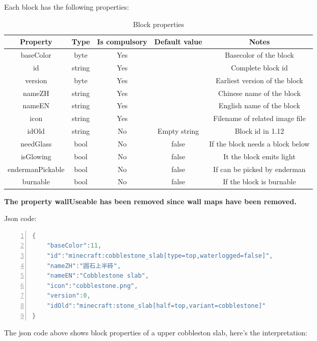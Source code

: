 \documentclass{article}
\begin{document}
Each block has the following properties:
\begin{table}[h]
    \centering
    \caption{Block properties}
    \begin{tabular}{ccccc}
        \hline
        Property         & Type   & Is compulsory & Default value & Notes                            \\ \hline
        baseColor        & byte   & Yes           &               & Basecolor of the block           \\
        id               & string & Yes           &               & Complete block id                \\
        version          & byte   & Yes           &               & Earliest version of the block    \\
        nameZH           & string & Yes           &               & Chinese name of the block        \\
        nameEN           & string & Yes           &               & English name of the block        \\
        icon             & string & Yes           &               & Filename of related image file   \\
        idOld            & string & No            & Empty string  & Block id in 1.12                 \\
        needGlass        & bool   & No            & false         & If the block needs a block below \\
        isGlowing        & bool   & No            & false         & It the block emits light         \\
        endermanPickable & bool   & No            & false         & If can be picked by enderman     \\
        burnable         & bool   & No            & false         & If the block is burnable         \\
        \hline
    \end{tabular}
\end{table}

\textbf{The property wallUseable has been removed since wall maps have been removed.}

\clearpage
Json code:
\begin{lstlisting}[language = C++, numbers=left, 
    numberstyle=\tiny,keywordstyle=\color{blue!70},
    commentstyle=\color{red!50!green!50!blue!50},frame=shadowbox,
    rulesepcolor=\color{red!20!green!20!blue!20},basicstyle=\ttfamily]
{
    "baseColor":11,
    "id":"minecraft:cobblestone_slab[type=top,waterlogged=false]",
    "nameZH":"圆石上半砖",
    "nameEN":"Cobblestone slab",
    "icon":"cobblestone.png",
    "version":0,
    "idOld":"minecraft:stone_slab[half=top,variant=cobblestone]"
}
    \end{lstlisting}
The json code above shows block properties of a upper cobbleston slab, here's the interpretation:
\end{document}
